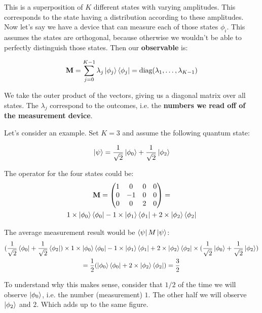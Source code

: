 \documentclass{article}
\begin{document}
This is a superposition of $K$ different states with varying amplitudes. This corresponds to the state having a distribution according to these amplitudes. Now let's say we have a device that can measure each of those states $\phi_i$. This assumes the states are orthogonal, because otherwise we wouldn't be able to perfectly distinguish those states. Then our \textbf{observable} is:

\begin{equation*}
    \textbf{M} = \sum_{j = 0}^{K - 1} \lambda_j
        \ket{\phi_j}\bra{\phi_j} = \text{diag}(\lambda_1, \dots, \lambda_{K - 1})
\end{equation*}

We take the outer product of the vectors, giving us a diagonal matrix over all states. The $\lambda_j$ correspond to the outcomes, i.e. the 
\textbf{numbers we read off of the measurement device}. 

Let's consider an example. Set $K = 3$ and assume the following quantum state:

\begin{equation*}
    \ket{\psi} = \frac{1}{\sqrt{2}}\ket{\phi_0} + \frac{1}{\sqrt{2}} \ket{\phi_2}
\end{equation*}

The operator for the four states could be:
\begin{gather*}
    \textbf{M} = \begin{pmatrix}
        1 & 0 & 0 & 0 \\
        0 & -1 & 0 & 0 \\
        0 & 0 & 2 & 0
    \end{pmatrix} = \\ 1 \times \ket{\phi_0}\bra{\phi_0} - 1 \times \ket{\phi_1}\bra{\phi_1} + 2 \times \ket{\phi_2}\bra{\phi_2}
\end{gather*}

The average measurement result would be $\bra{\psi} M \ket{\psi}$: 
\begin{gather*}
    (\frac{1}{\sqrt{2}}\bra{\phi_0} + \frac{1}{\sqrt{2}} \bra{\phi_2}) \times 1 \times \ket{\phi_0}\bra{\phi_0} - 1 \times \ket{\phi_1}\bra{\phi_1} + 2 \times \ket{\phi_2}\bra{\phi_2} \times (\frac{1}{\sqrt{2}}\ket{\phi_0} + \frac{1}{\sqrt{2}} \ket{\phi_2}) \\
    = \frac{1}{2} (\ket{\phi_0} \bra{\phi_0} + 2 \times \ket{\phi_2}\bra{\phi_2}) = \frac{3}{2}
\end{gather*}

To understand why this makes sense, consider that $1/2$ of the time we will observe $\ket{\phi_0}$, i.e. the number (measurement) $1$. The other half we will observe $\ket{\phi_2}$ and $2$. Which adds up to the same figure.
\end{document}
